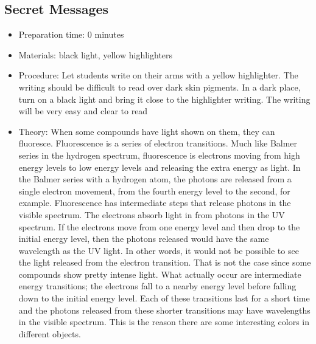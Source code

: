 \subsection{Secret Messages}
\begin{itemize}
\item{Preparation time: 0 minutes}
\item{Materials: black light, yellow highlighters}
\item{Procedure: Let students write on their arms with a yellow highlighter. The writing should be difficult to read over dark skin pigments. In a dark place, turn on a black light and bring it close to the highlighter writing. The writing will be very easy and clear to read}
\item{Theory: When some compounds have light shown on them, they can fluoresce. Fluorescence is a series of electron transitions. Much like Balmer series in the hydrogen spectrum, fluorescence is electrons moving from high energy levels to low energy levels and releasing the extra energy as light. In the Balmer series with a hydrogen atom, the photons are released from a single electron movement, from the fourth energy level to the second, for example. Fluorescence has intermediate steps that release photons in the visible spectrum. The electrons absorb light in from photons in the UV spectrum. If the electrons move from one energy level and then drop to the initial energy level, then the photons released would have the same wavelength as the UV light. In other words, it would not be possible to see the light released from the electron transition. That is not the case since some compounds show pretty intense light. What actually occur are intermediate energy transitions; the electrons fall to a nearby energy level before falling down to the initial energy level. Each of these transitions last for a short time and the photons released from these shorter transitions may have wavelengths in the visible spectrum. This is the reason there are some interesting colors in different objects.}
\end{itemize}

